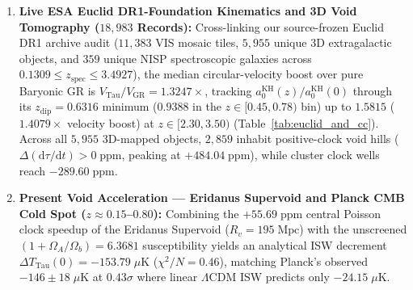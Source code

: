 \documentclass[11pt,a4paper]{article}
\theoremstyle{remark}
\begin{document}
\begin{enumerate}
  \item \textbf{Live ESA Euclid DR1-Foundation Kinematics and 3D Void Tomography ($18,983$ Records):} Cross-linking our source-frozen Euclid DR1 archive audit \cite{EuclidDR1Archive2026,JolcsakTauPaper20Euclid2026} ($11,383$ VIS mosaic tiles, $5,955$ unique 3D extragalactic objects, and $359$ unique NISP spectroscopic galaxies across $0.1309 \le z_{\mathrm{spec}} \le 3.4927$), the median circular-velocity boost over pure Baryonic GR is $V_{\mathrm{Tau}}/V_{\mathrm{GR}} = 1.3247\times$, tracking $a_0^{\mathrm{KH}}(z)/a_0^{\mathrm{KH}}(0)$ through its $z_{\mathrm{dip}} = 0.6316$ minimum ($0.9388$ in the $z \in [0.45, 0.78)$ bin) up to $1.5815$ ($1.4079\times$ velocity boost) at $z \in [2.30, 3.50)$ (Table~\ref{tab:euclid_and_cc}). Across all $5,955$ 3D-mapped objects, $2,859$ inhabit positive-clock void hills ($\Delta(\mathrm{d}\tau/\mathrm{d}t) > 0\;\mathrm{ppm}$, peaking at $+484.04\;\mathrm{ppm}$), while cluster clock wells reach $-289.60\;\mathrm{ppm}$.
  \item \textbf{Present Void Acceleration --- Eridanus Supervoid and Planck CMB Cold Spot ($z \approx 0.15$--$0.80$):} Combining the $+55.69\;\mathrm{ppm}$ central Poisson clock speedup of the Eridanus Supervoid ($R_v = 195\;\mathrm{Mpc}$) with the unscreened $(1 + \Omega_A/\Omega_b) = 6.3681$ susceptibility yields an analytical ISW decrement $\Delta T_{\mathrm{Tau}}(0) = -153.79\;\mu\mathrm{K}$ ($\chi^2/N = 0.46$), matching Planck's observed $-146 \pm 18\;\mu\mathrm{K}$ at \textbf{$0.43\sigma$} \cite{Kovacs2022Eridanus} where linear $\Lambda\mathrm{CDM}$ ISW predicts only $-24.15\;\mu\mathrm{K}$.
\end{enumerate}
\end{document}
